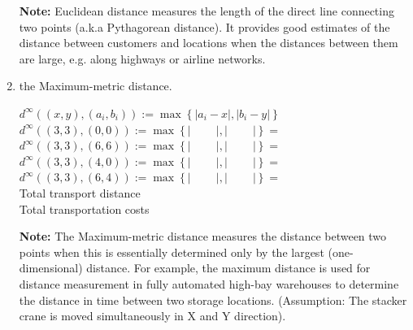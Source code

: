 \begin{enumerate}
\begin{solution}
	\textbf{Note:} Euclidean distance measures the length of the direct line connecting two points (a.k.a Pythagorean distance). It provides good estimates of the distance between customers and locations when the distances between them are large, e.g. along highways or airline networks.
	\end{solution}
	
	\item the Maximum-metric distance.	
	\begin{solution}
	$d^\infty\left(\left(x,y\right),\left(a_i,b_i\right)\right):=\max\left\{\left|a_i-x\right|,\left|b_i-y\right|\right\}$\\
	$d^\infty\left(\left(3,3\right),\left(0,0\right)\right):=\max\left\{\left|\phantom{0-3}\right|,\left|\phantom{0-3}\right|\right\}=\phantom{3}$\\
	$d^\infty\left(\left(3,3\right),\left(6,6\right)\right):=\max\left\{\left|\phantom{6-3}\right|,\left|\phantom{6-3}\right|\right\}=\phantom{s}$\\
	$d^\infty\left(\left(3,3\right),\left(4,0\right)\right):=\max\left\{\left|\phantom{4-3}\right|,\left|\phantom{0-3}\right|\right\}=\phantom{3}$\\
	$d^\infty\left(\left(3,3\right),\left(6,4\right)\right):=\max\left\{\left|\phantom{6-3}\right|,\left|\phantom{4-3}\right|\right\}=\phantom{3}$\\
	Total transport distance \phantom{$=2\cdot4\cdot3+2\cdot4\cdot3+2\cdot2\cdot3+2\cdot2\cdot3=72$}\\
	Total transportation costs \phantom{$72\cdot0.5=36$}
	
	\textbf{Note:} The Maximum-metric distance measures the distance between two points when this is essentially determined only by the largest (one-dimensional) distance. For example, the maximum distance is used for distance measurement in fully automated high-bay warehouses to determine the distance in time between two storage locations. (Assumption: The stacker crane is moved simultaneously in X and Y direction).
	\end{solution}
	

\end{enumerate}
